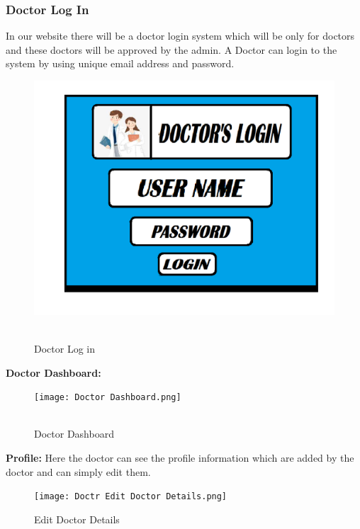 \documentclass[14pt,a4paper,calibribody]{article}
\begin{document}
\subsubsection{Doctor Log In}
In our website there will be a doctor login system which will be only for doctors and these doctors will be approved by the admin. A Doctor can login to the system by using unique email address and password.\\
\begin{figure}[h]
\includegraphics [scale=0.17]{Doctor Login.png}\\\\
\caption{Doctor Log in}
\end{figure}

\textbf{Doctor Dashboard:}\\
\begin{figure}[h]
\texttt{[image: Doctor Dashboard.png]}\\\\
\caption{Doctor Dashboard}
\end{figure}
\clearpage
\textbf{Profile:} Here the doctor can see the profile information which are added by the doctor and can simply edit them.\\
\begin{figure}[h]
\texttt{[image: Doctr Edit Doctor Details.png]}\\
\caption{Edit Doctor Details}
\end{figure}
\end{document}
